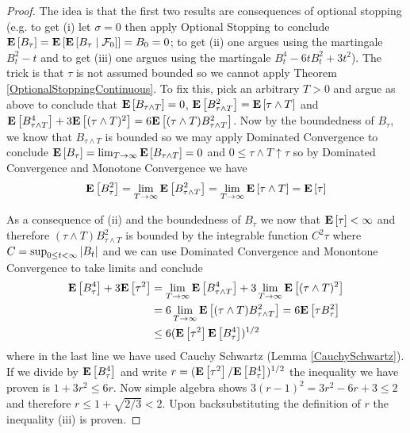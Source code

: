 \begin{proof}
The idea is that the first two results are consequences of optional
stopping (e.g. to get (i) let  $\sigma = 0$  
then apply Optional Stopping to conclude $\expectation{B_\tau} =
\expectation{\cexpectationlong{\mathcal{F}_0}{B_\tau}} = B_0 = 0$; to
get (ii) one argues using the martingale $B_t^2 - t$ and to get (iii)
one argues using the martingale $B_t^4 -6tB_t^2 + 3t^2$).  The trick is
that $\tau$ is not assumed bounded so we cannot apply Theorem
\ref{OptionalStoppingContinuous}.  To fix this, pick an arbitrary $T >
0$ and argue as above to conclude that $\expectation{B_{\tau \wedge
    T}} = 0$, $\expectation{B_{\tau \wedge
    T}^2} = \expectation{\tau \wedge T}$ and $\expectation{B_{\tau
    \wedge T}^4 } + 3\expectation{(\tau \wedge T)^2} = 6
  \expectation{(\tau \wedge T) B_{\tau \wedge T}^2}$.  Now by the boundedness of
$B_\tau$, we know that $B_{\tau \wedge T}$ is bounded so we may apply
Dominated Convergence to conclude $\expectation{B_\tau} = \lim_{T \to
  \infty} \expectation{B_{\tau \wedge T}} = 0$ and $0 \leq \tau \wedge T
\uparrow \tau$ so by Dominated Convergence and Monotone Convergence we
have
\begin{align*}
\expectation{B_\tau^2} = \lim_{T \to \infty} \expectation{B_{\tau
    \wedge T}^2} = \lim_{T \to \infty} \expectation{\tau \wedge T} = \expectation{\tau}
\end{align*}

As a consequence of (ii) and the boundedness of $B_\tau$ we now that
$\expectation{\tau} < \infty$ and therefore $(\tau  \wedge T)
B_{\tau\wedge T}^2$ is bounded
by the integrable function $C^2 \tau$ where $C = \sup_{0 \leq t <
  \infty} \abs{B_t}$ and we can use Dominated Convergence
and Monontone Convergence to take limits and conclude 
\begin{align*}
\expectation{B_{\tau}^4 } + 3\expectation{\tau^2} &= \lim_{T \to
  \infty} \expectation{B_{\tau
    \wedge T}^4 } + 3\lim_{T \to \infty} \expectation{(\tau \wedge
  T)^2} \\
&= 6
\lim_{T \to \infty}  \expectation{(\tau \wedge T) B_{\tau \wedge T}^2}
=  6 \expectation{\tau B_{\tau}^2} \\
&\leq 6 (\expectation{\tau^2} \expectation{B_\tau^4})^{1/2}
\end{align*}
where in the last line we have used Cauchy Schwartz (Lemma
\ref{CauchySchwartz}).  If we divide by $\expectation{B_\tau^4}$ and
write $r = (\expectation{\tau^2} /\expectation{B_\tau^4})^{1/2}$ the
inequality we have proven is $1 + 3r^2 \leq 6 r$.  Now simple algebra
shows 
$3(r -1)^2 = 3r^2 - 6r + 3 \leq 2$
and therefore $r \leq 1 + \sqrt{2/3} < 2$. Upon backsubstituting the
definition of $r$ the inequality (iii) is proven.
\end{proof}


